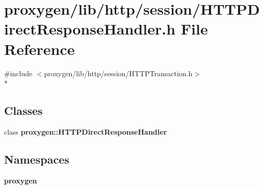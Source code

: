 \section{proxygen/lib/http/session/\+H\+T\+T\+P\+Direct\+Response\+Handler.h File Reference}
\label{HTTPDirectResponseHandler_8h}
{\ttfamily \#include $<$proxygen/lib/http/session/\+H\+T\+T\+P\+Transaction.\+h$>$}\\*
\subsection*{Classes}
\begin{DoxyCompactItemize}
\item 
class {\bf proxygen\+::\+H\+T\+T\+P\+Direct\+Response\+Handler}
\end{DoxyCompactItemize}
\subsection*{Namespaces}
\begin{DoxyCompactItemize}
\item 
 {\bf proxygen}
\end{DoxyCompactItemize}
